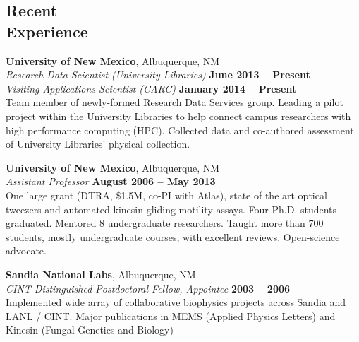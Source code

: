 \documentclass[margin,line]{resume}
\begin{document}
\begin{resume}
    \section{\mysidestyle Recent\\Experience}

    \textbf{University of New Mexico}, Albuquerque, NM \vspace{2mm}\\\vspace{1mm}%
    \textsl{Research Data Scientist (University Libraries)} \hfill \textbf{June 2013 -- Present}\\
    \textsl{Visiting Applications Scientist (CARC)} \hfill \textbf{January 2014 -- Present}\\
    Team member of newly-formed Research Data Services group. Leading a pilot project within the University Libraries to help connect campus researchers with high performance computing (HPC). Collected data and co-authored assessment of University Libraries' physical collection.

    \textbf{University of New Mexico}, Albuquerque, NM \vspace{2mm}\\\vspace{1mm}%
    \textsl{Assistant Professor} \hfill \textbf{August 2006 -- May 2013}\\
    One large grant (DTRA, \$1.5M, co-PI with Atlas), state of the art optical tweezers and automated kinesin gliding motility assays. Four Ph.D. students graduated. Mentored 8 undergraduate researchers. Taught more than 700 students, mostly undergraduate courses, with excellent reviews.  Open-science advocate.

    \textbf{Sandia National Labs}, Albuquerque, NM \vspace{2mm}\\\vspace{1mm}%
    \textsl{CINT Distinguished Postdoctoral Fellow, Appointee} \hfill \textbf{2003 -- 2006}\\
    Implemented wide array of collaborative biophysics projects across Sandia and LANL / CINT.  Major publications in MEMS (Applied Physics Letters) and Kinesin (Fungal Genetics and Biology)

    

\end{resume}
\end{document}
